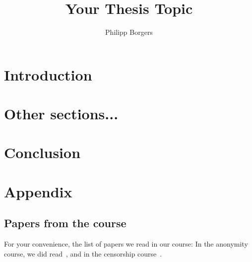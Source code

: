 \documentclass[twocolumn, a4paper, 10pt]{article}
\begin{document}
\title{\Large Your Thesis Topic}

\author{Philipp Borgers}

\maketitle

\def\abstractname{{\textbf Abstract}}
\begin{abstract}
\textbf{\lipsum[1]}
\end{abstract}


\section{Introduction}
\lipsum[2-5]

\section{Other sections...}
\lipsum[6-8]

\section{Conclusion}
\lipsum[9]

\appendix
\section{Appendix}

\subsection{Papers from the course}
For your convenience, the list of papers we read in our course: In the anonymity course, we did read~\cite{
	Chaum1981, 
	Chaum1988,
	Pfitzmann1991,
	Chor1998,
	Park1994,
	Reiter1998,
	Goldschlag1996,
	Raymond2001,
	Dingledine2004,
	Douceur2002,
	Serjantov2002,
	Danezis2003,
	Murdoch2005,
	Goldreich2002,
	Yao1982,
	Cai2012,
	Camenisch2002,
	Johnson2013,
	Tsang2011,
	Murdoch2006,
	Miers2013,
	Narayanan2009,
	Bonneau2014,
	Michalis2014,
	Syverson2009},
and in the censorship course~\cite{
	Anderson1996,
	Waldman2000,
	Waldman2001,
	Feamster2003,
	Feamster2002,
	Dingledine2006,
	Clayton2006,
	Chor1998,
	Perng2005,
	Clarke2002,
	Crandall2007,
	Douceur2002,
	Winter2012,
	Moghaddam2012,
	Fifield2012,
	Houmansadr2013b,
	Lincoln2012,
	Verkamp2013,
	Wustrow2011,
	Burnett2010,
	Schuchard2012,
	Invernizzi2013,
	Houmansadr2014a}.
\end{document}
